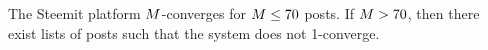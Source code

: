 \begin{corollary}
  \label{corollary:convergence:steem}
  The Steemit platform $M$-converges for $M \leq 70$ posts. If
  $M > 70$, then there exist lists of posts such that the system does not
  1-converge.
\end{corollary}

